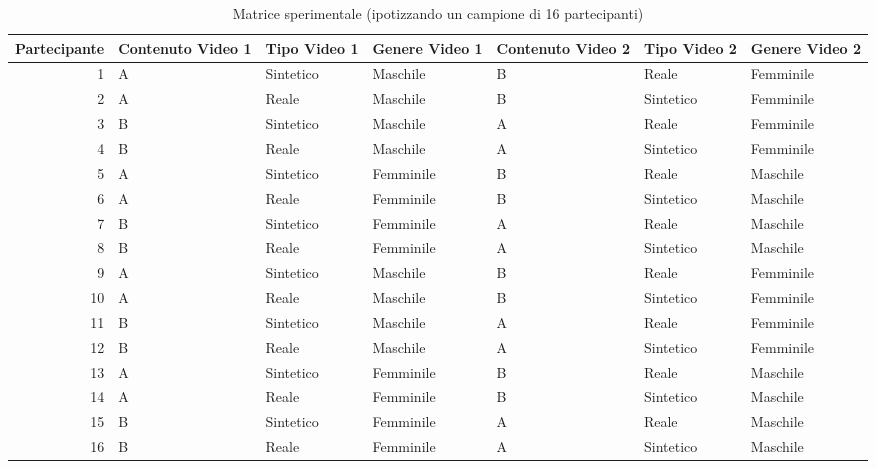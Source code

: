 \begin{table}[t]
    \begin{tabular}{|r| p{1.9cm} p{1.51cm} p{1.75cm} p{1.9cm} p{1.5cm} p{1.91cm}| }
        \hline
        Partecipante & Contenuto Video 1 & Tipo Video 1 & Genere Video 1 & Contenuto Video 2 & Tipo Video 2 & Genere Video 2 \\ \hline
        1 & A & Sintetico & Maschile & B & Reale & Femminile \\
        \hline
        2 & A & Reale & Maschile & B & Sintetico & Femminile \\
        \hline
        3 & B & Sintetico & Maschile & A & Reale & Femminile \\
        \hline
        4 & B & Reale & Maschile & A & Sintetico & Femminile \\
        \hline
        5 & A & Sintetico & Femminile & B & Reale & Maschile \\
        \hline
        6 & A & Reale & Femminile & B & Sintetico & Maschile \\
        \hline
        7 & B & Sintetico & Femminile & A & Reale & Maschile \\
        \hline
        8 & B & Reale & Femminile & A & Sintetico & Maschile \\ \hline
        9 & A & Sintetico & Maschile & B & Reale & Femminile \\
        \hline
        10 & A & Reale & Maschile & B & Sintetico & Femminile \\
        \hline
        11 & B & Sintetico & Maschile & A & Reale & Femminile \\
        \hline
        12 & B & Reale & Maschile & A & Sintetico & Femminile \\
        \hline
        13 & A & Sintetico & Femminile & B & Reale & Maschile \\
        \hline
        14 & A & Reale & Femminile & B & Sintetico & Maschile \\
        \hline
        15 & B & Sintetico & Femminile & A & Reale & Maschile \\
        \hline
        16 & B & Reale & Femminile & A & Sintetico & Maschile \\ \hline
    \end{tabular}
    \centering
    \caption{Matrice sperimentale (ipotizzando un campione di 16 partecipanti)}
    \label{tab:matrice_sperimentale}
\end{table}

